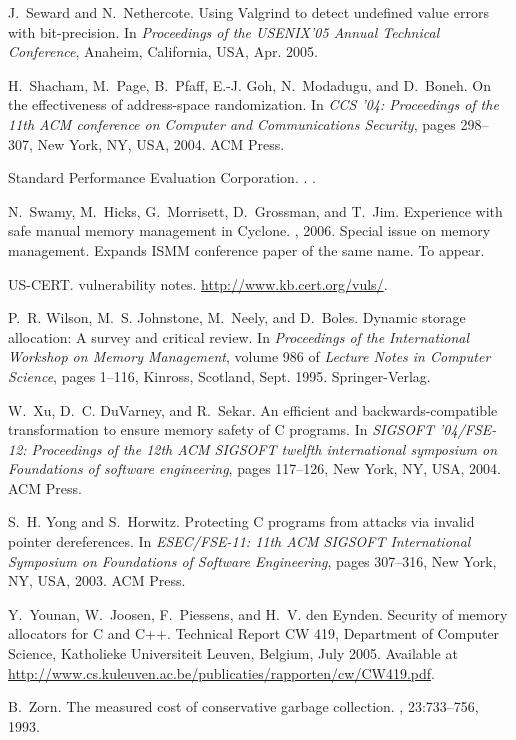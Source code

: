 \documentclass{sig-alternate}
\begin{document}
\begin{thebibliography}{10}
J.~Seward and N.~Nethercote.
\newblock Using {V}algrind to detect undefined value errors with bit-precision.
\newblock In {\em Proceedings of the USENIX'05 Annual Technical Conference},
  Anaheim, California, USA, Apr. 2005.

H.~Shacham, M.~Page, B.~Pfaff, E.-J. Goh, N.~Modadugu, and D.~Boneh.
\newblock On the effectiveness of address-space randomization.
\newblock In {\em CCS '04: Proceedings of the 11th ACM conference on Computer
  and Communications Security}, pages 298--307, New York, NY, USA, 2004. ACM
  Press.

{Standard Performance Evaluation Corporation}.
.
.

\vfill\eject

N.~Swamy, M.~Hicks, G.~Morrisett, D.~Grossman, and T.~Jim.
\newblock Experience with safe manual memory management in Cyclone.
, 2006.
\newblock Special issue on memory management. Expands ISMM conference paper of
  the same name. To appear.

{US-CERT}.
 vulnerability notes.
\newblock \url{http://www.kb.cert.org/vuls/}.

P.~R. Wilson, M.~S. Johnstone, M.~Neely, and D.~Boles.
\newblock Dynamic storage allocation: A survey and critical review.
\newblock In {\em Proceedings of the International Workshop on Memory
  Management}, volume 986 of {\em Lecture Notes in Computer Science}, pages
  1--116, Kinross, Scotland, Sept. 1995. Springer-Verlag.

W.~Xu, D.~C. DuVarney, and R.~Sekar.
\newblock An efficient and backwards-compatible transformation to ensure memory
  safety of {C} programs.
\newblock In {\em SIGSOFT '04/FSE-12: Proceedings of the 12th ACM SIGSOFT
  twelfth international symposium on Foundations of software engineering},
  pages 117--126, New York, NY, USA, 2004. ACM Press.

S.~H. Yong and S.~Horwitz.
\newblock Protecting {C} programs from attacks via invalid pointer
  dereferences.
\newblock In {\em ESEC/FSE-11: 11th ACM SIGSOFT International Symposium on
  Foundations of Software Engineering}, pages 307--316, New York, NY, USA,
  2003. ACM Press.

Y.~Younan, W.~Joosen, F.~Piessens, and H.~V. den Eynden.
\newblock Security of memory allocators for {C} and {C++}.
\newblock Technical Report CW 419, Department of Computer Science, Katholieke
  Universiteit Leuven, Belgium, July 2005.
\newblock Available at
  \url{http://www.cs.kuleuven.ac.be/publicaties/rapporten/cw/CW419.pdf}.

B.~Zorn.
\newblock The measured cost of conservative garbage collection.
, 23:733--756, 1993.

\end{thebibliography}

\balancecolumns
\end{document}
